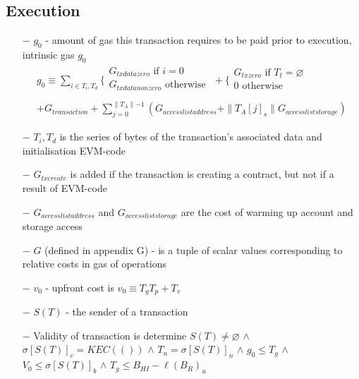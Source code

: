 \documentclass{article}
\begin{document}
\subsection{Execution}

\begin{itemize}
    \item[$-$] $g_0$ - amount of gas this transaction requires to be paid prior to execution, intrinsic gas $g_0$
    \begin{align*}     
        g_0 \equiv \sum_{i \in T_i, T_d} \biggl\{
            \begin{array}{ll}
                G_{txdatazero} \text{ if } i=0\\
                G_{txdatanonzero} \text{ otherwise }\\
            \end{array}
            + \biggl\{
                \begin{array}{ll}
                    G_{txzero} \text{ if } T_t = \varnothing \\
                    0 \text{ otherwise} \\
                \end{array} \\
            + G_{transaction} 
            + \sum_{j=0}^{\parallel T_A \parallel - 1} 
            (G_{accesslistaddress} 
            + \| T_A[j]_s \| G_{accessliststorage})
    \end{align*}
        \item[$-$] $T_i, T_d$ is the series of bytes of the transaction's associated data and initialisation EVM-code
        \item[$-$] $G_{txcreate}$ is added if the transaction is creating a contract, but not if a result of EVM-code 
        \item[$-$] $G_{accesslistaddress}$ and $G_{accessliststorage}$ are the cost of warming up account and storage access
        \item[$-$] $G$ (defined in appendix G) - is a tuple of scalar values corresponding to relative costs in gas of operations 
        \item[$-$] $v_0$ - upfront cost is $v_0 \equiv T_gT_p + T_v$
        \item[$-$] $S(T)$ - the sender of a transaction
        \item[$-$] Validity of transaction is determine $S(T) \neq \varnothing$ $\wedge$ $\sigma[S(T)]_c = KEC(())$ $\wedge$ $T_n = \sigma[S(T)]_n$ $\wedge$ $g_0 \leq T_g$ $\wedge$ $V_0 \leq \sigma[S(T)]_b$ $\wedge$ $T_g \leq B_{HI} - \ell(B_R)_u$

\end{itemize}
\end{document}

